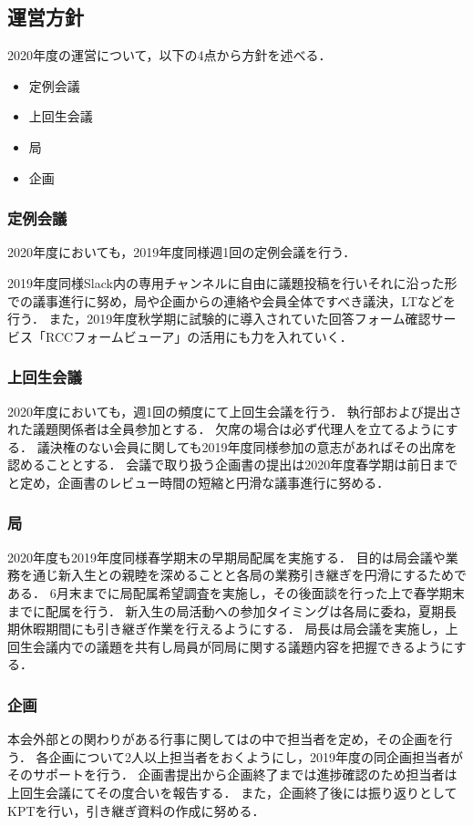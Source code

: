 \subsection*{運営方針}


2020年度の運営について，以下の4点から方針を述べる．
\begin{itemize}
    \item 定例会議
    \item 上回生会議
    \item 局
    \item 企画
\end{itemize}

\subsubsection*{定例会議}
2020年度においても，2019年度同様週1回の定例会議を行う．

2019年度同様Slack内の専用チャンネルに自由に議題投稿を行いそれに沿った形での議事進行に努め，局や企画からの連絡や会員全体ですべき議決，LTなどを行う．
また，2019年度秋学期に試験的に導入されていた回答フォーム確認サービス「RCCフォームビューア」の活用にも力を入れていく．


\subsubsection*{上回生会議}
2020年度においても，週1回の頻度にて上回生会議を行う．
執行部および提出された議題関係者は全員参加とする．
欠席の場合は必ず代理人を立てるようにする．
議決権のない会員に関しても2019年度同様参加の意志があればその出席を認めることとする．
会議で取り扱う企画書の提出は2020年度春学期は前日までと定め，企画書のレビュー時間の短縮と円滑な議事進行に努める．

\subsubsection*{局}
2020年度も2019年度同様春学期末の早期局配属を実施する．
目的は局会議や業務を通じ新入生との親睦を深めることと各局の業務引き継ぎを円滑にするためである．
6月末までに局配属希望調査を実施し，その後面談を行った上で春学期末までに配属を行う．
新入生の局活動への参加タイミングは各局に委ね，夏期長期休暇期間にも引き継ぎ作業を行えるようにする．
局長は局会議を実施し，上回生会議内での議題を共有し局員が同局に関する議題内容を把握できるようにする．


\subsubsection*{企画}
本会外部との関わりがある行事に関しては\secondGrade{}の中で担当者を定め，その企画を行う．
各企画について2人以上担当者をおくようにし，2019年度の同企画担当者がそのサポートを行う．
企画書提出から企画終了までは進捗確認のため担当者は上回生会議にてその度合いを報告する．
また，企画終了後には振り返りとしてKPTを行い，引き継ぎ資料の作成に努める．
